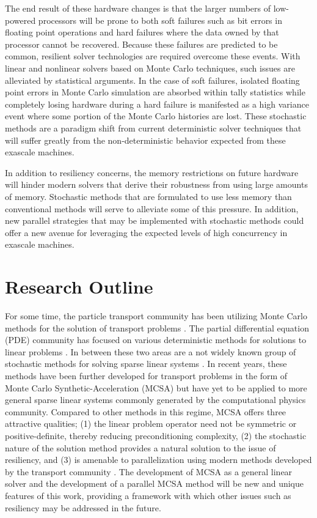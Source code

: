 The end result of these hardware changes is that the larger numbers of
low-powered processors will be prone to both soft failures such as bit
errors in floating point operations and hard failures where the data
owned by that processor cannot be recovered. Because these failures
are predicted to be common, resilient solver technologies are required
overcome these events. With linear and nonlinear solvers based on
Monte Carlo techniques, such issues are alleviated by statistical
arguments. In the case of soft failures, isolated floating point
errors in Monte Carlo simulation are absorbed within tally statistics
while completely losing hardware during a hard failure is manifested
as a high variance event where some portion of the Monte Carlo
histories are lost. These stochastic methods are a paradigm shift from
current deterministic solver techniques that will suffer greatly from
the non-deterministic behavior expected from these exascale machines.

In addition to resiliency concerns, the memory restrictions on future
hardware will hinder modern solvers that derive their robustness from
using large amounts of memory. Stochastic methods that are formulated
to use less memory than conventional methods will serve to alleviate
some of this pressure. In addition, new parallel strategies that may
be implemented with stochastic methods could offer a new avenue for
leveraging the expected levels of high concurrency in exascale
machines.

\section{Research Outline}
\label{sec:research_outline}
For some time, the particle transport community has been utilizing
Monte Carlo methods for the solution of transport problems
\citep{lewis_computational_1993}. The partial differential equation
(PDE) community has focused on various deterministic methods for
solutions to linear problems \citep{saad_iterative_2003,
  kelley_iterative_1995}. In between these two areas are a not widely
known group of stochastic methods for solving sparse linear systems
\citep{forsythe_matrix_1950, hammersley_monte_1964,
  halton_sequential_1962, halton_sequential_1994}. In recent years,
these methods have been further developed for transport problems in
the form of Monte Carlo Synthetic-Acceleration (MCSA)
\citep{evans_residual_2003, evans_monte_2009, evans_monte_2012} but
have yet to be applied to more general sparse linear systems commonly
generated by the computational physics community. Compared to other
methods in this regime, MCSA offers three attractive qualities; (1)
the linear problem operator need not be symmetric or
positive-definite, thereby reducing preconditioning complexity, (2)
the stochastic nature of the solution method provides a natural
solution to the issue of resiliency, and (3) is amenable to
parallelization using modern methods developed by the transport
community \citep{wagner_hybrid_2010}. The development of MCSA as a
general linear solver and the development of a parallel MCSA method
will be new and unique features of this work, providing a framework
with which other issues such as resiliency may be addressed in the
future.

